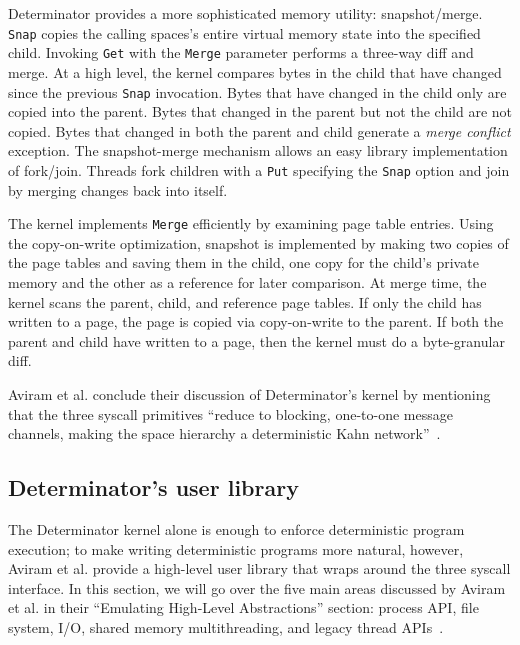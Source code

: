 Determinator provides a more sophisticated memory utility: snapshot/merge.
{\tt Snap} copies the calling spaces's entire virtual memory state into the
specified child. Invoking {\tt Get} with the {\tt Merge} parameter performs a
three-way diff and merge. At a high level, the kernel compares bytes
in the child that have changed since the previous {\tt Snap} invocation. Bytes
that have changed in the child only are copied into the parent. Bytes that
changed in the parent but not the child are not copied.
Bytes that changed in both the parent and child generate a
\emph{merge conflict} exception. The snapshot-merge mechanism allows an easy
library implementation of fork/join. Threads fork children with a
{\tt Put} specifying the {\tt Snap} option and join by merging changes back into
itself.

The kernel implements {\tt Merge} efficiently by examining page table entries.
Using the copy-on-write optimization, snapshot is implemented by making two
copies of the page tables and saving them in the child, one copy for the child's
private memory and the other as a reference for later comparison. At merge time,
the kernel scans the parent, child, and reference page tables. If only the child
has written to a page, the page is copied via copy-on-write to the parent. If
both the parent and child have written to a page, then the kernel must do a
byte-granular diff.

Aviram et al. conclude their discussion of Determinator's kernel by mentioning
that the three syscall primitives ``reduce to blocking, one-to-one message
channels, making the space hierarchy a deterministic Kahn
network''~\cite{Aviram10,kahn1974semantics}.

\subsection{Determinator's user library}

The Determinator kernel alone is enough to enforce deterministic program
execution; to make writing deterministic programs more natural, however, Aviram
et al. provide a high-level user library that wraps around the three syscall
interface. In this section, we will go over
the five main areas discussed by Aviram et al. in their ``Emulating High-Level
Abstractions'' section: process API, file system, I/O, shared memory
multithreading, and legacy thread APIs~\cite{Aviram10}.

